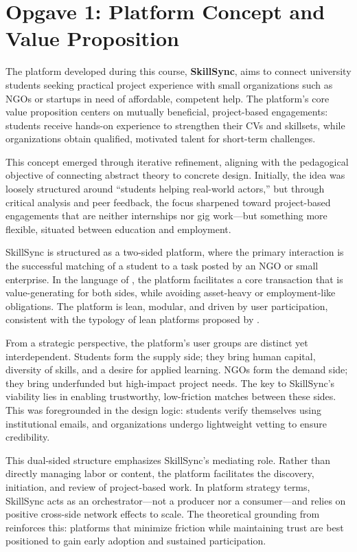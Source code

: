 \section*{Opgave 1: Platform Concept and Value Proposition}

The platform developed during this course, \textbf{SkillSync}, aims to connect university students seeking practical project experience with small organizations such as NGOs or startups in need of affordable, competent help. The platform's core value proposition centers on mutually beneficial, project-based engagements: students receive hands-on experience to strengthen their CVs and skillsets, while organizations obtain qualified, motivated talent for short-term challenges.

This concept emerged through iterative refinement, aligning with the pedagogical objective of connecting abstract theory to concrete design. Initially, the idea was loosely structured around ``students helping real-world actors,'' but through critical analysis and peer feedback, the focus sharpened toward project-based engagements that are neither internships nor gig work---but something more flexible, situated between education and employment.

SkillSync is structured as a two-sided platform, where the primary interaction is the successful matching of a student to a task posted by an NGO or small enterprise. In the language of \citet{Choudary2016}, the platform facilitates a core transaction that is value-generating for both sides, while avoiding asset-heavy or employment-like obligations. The platform is lean, modular, and driven by user participation, consistent with the typology of lean platforms proposed by \citet{Srnicek2017}.

From a strategic perspective, the platform's user groups are distinct yet interdependent. Students form the supply side; they bring human capital, diversity of skills, and a desire for applied learning. NGOs form the demand side; they bring underfunded but high-impact project needs. The key to SkillSync’s viability lies in enabling trustworthy, low-friction matches between these sides. This was foregrounded in the design logic: students verify themselves using institutional emails, and organizations undergo lightweight vetting to ensure credibility.

This dual-sided structure emphasizes SkillSync’s mediating role. Rather than directly managing labor or content, the platform facilitates the discovery, initiation, and review of project-based work. In platform strategy terms, SkillSync acts as an orchestrator---not a producer nor a consumer---and relies on positive cross-side network effects to scale. The theoretical grounding from \citet{Reillier2017} reinforces this: platforms that minimize friction while maintaining trust are best positioned to gain early adoption and sustained participation.

